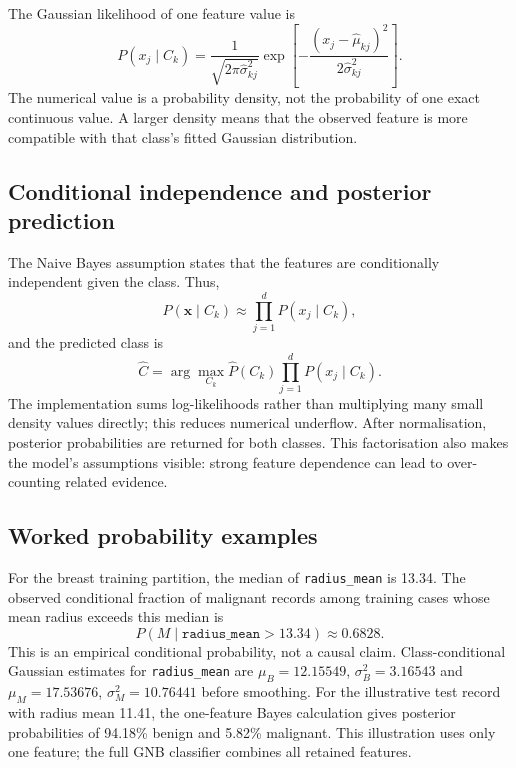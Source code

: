 \documentclass[conference]{IEEEtran}
\begin{document}
The Gaussian likelihood of one feature value is
\begin{equation}
P(x_j\mid C_k)=\frac{1}{\sqrt{2\pi\widehat{\sigma}^{2}_{kj}}}
\exp\!\left[-\frac{(x_j-\widehat{\mu}_{kj})^2}{2\widehat{\sigma}^{2}_{kj}}\right].
\label{eq:gaussian}
\end{equation}
The numerical value is a probability density, not the probability of one exact continuous value. A larger density means that the observed feature is more compatible with that class's fitted Gaussian distribution.

\subsection{Conditional independence and posterior prediction}
The Naive Bayes assumption states that the features are conditionally independent given the class. Thus,
\begin{equation}
P(\mathbf{x}\mid C_k)\approx\prod_{j=1}^{d}P(x_j\mid C_k),
\label{eq:independence}
\end{equation}
and the predicted class is
\begin{equation}
\widehat{C}=\arg\max_{C_k}\widehat{P}(C_k)
\prod_{j=1}^{d}P(x_j\mid C_k).
\label{eq:decision}
\end{equation}
The implementation sums log-likelihoods rather than multiplying many small density values directly; this reduces numerical underflow. After normalisation, posterior probabilities are returned for both classes. This factorisation also makes the model's assumptions visible: strong feature dependence can lead to over-counting related evidence.

\subsection{Worked probability examples}
For the breast training partition, the median of \texttt{radius\_mean} is 13.34. The observed conditional fraction of malignant records among training cases whose mean radius exceeds this median is
\begin{equation}
P(M\mid\texttt{radius\_mean}>13.34)\approx0.6828.
\end{equation}
This is an empirical conditional probability, not a causal claim. Class-conditional Gaussian estimates for \texttt{radius\_mean} are $\mu_B=12.15549$, $\sigma_B^2=3.16543$ and $\mu_M=17.53676$, $\sigma_M^2=10.76441$ before smoothing. For the illustrative test record with radius mean 11.41, the one-feature Bayes calculation gives posterior probabilities of 94.18\% benign and 5.82\% malignant. This illustration uses only one feature; the full GNB classifier combines all retained features.
\end{document}
